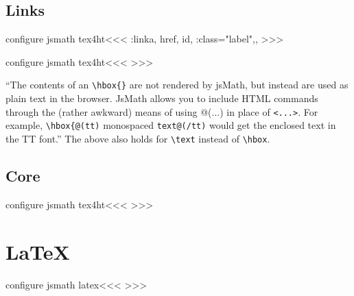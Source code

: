 {{%
\subsection{Links}




\<configure jsmath tex4ht\><<<
\def\Hbrakets<#1>{\ifmathltx 
       \ifmtext    @(#1)\else \string\hbox{@(#1)}\fi
    \else <#1>\fi}
\def\EndLink{\ifmathltx 
     \ifmtext    |<end mtext space|>%
        \egroup \HCode{\%\Hnewline\%}\Endmtxt:link
        \HCode{\string\end{ref}\Hnewline}|<start mtext space|>%
     \else  \HCode{\Hbrakets</a>}\fi
   \else \expandafter\M:EndLink\fi}
\LinkCommand\msp:link{a, href, id, \mml:class="label",,}
>>>

\<configure jsmath tex4ht\><<<
\def\Link{\M:Link}
\def\EndLink{\M:EndLink}
>>>


``The contents of an \verb=\hbox{}= are not rendered by jsMath, but
instead are used as plain text in the browser.  JsMath allows you to
include HTML commands through the (rather awkward) means of using
@(...) in place of \verb=<...>=.  For example, \verb=\hbox{@(tt)=
  monospaced \verb=text@(/tt)= would get the enclosed text in the TT font.''
The above also holds for \verb=\text= instead of \verb=\hbox=.



\subsection{Core}



\<configure jsmath tex4ht\><<<
   {}
   {\HCode{\string\over\space}}
   {}
   {\HCode{\string\atop\space}}
>>>




\section{LaTeX}


\<configure jsmath latex\><<<
\def\set:label#1{\ifmathltx
  \else #1\fi
}
>>>




}}
